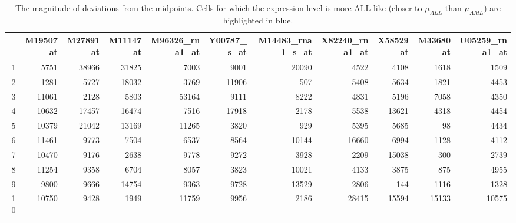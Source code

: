 \begin{table}[ht]
	\tiny
	\centering
	\begin{tabular}{r|rrrrr|rrrrr}
		\hline
		& M19507\_at & M27891\_at & M11147\_at & M96326\_rna1\_at & Y00787\_s\_at & M14483\_rna1\_s\_at & X82240\_rna1\_at & X58529\_at & M33680\_at & U05259\_rna1\_at \\ 
		\hline
		1 & 5751 \cellcolor{lightblue} & 38966 & 31825 & 7003 \cellcolor{lightblue} & 9001 \cellcolor{lightblue} & 20090 & 4522 & 4108 \cellcolor{lightblue} & 1618 & 1509 \\ 
		2 & 1281 & 5727 \cellcolor{lightblue} & 18032 & 3769 \cellcolor{lightblue} &  11906 & 507 & 5408 & 5634 & 1821 & 4453 \\ 
		3 & 11061 & 2128 \cellcolor{lightblue} & 5803 & 53164 & 9111 \cellcolor{lightblue} & 8222 & 4831 & 5196 & 7058 & 4350 \\ 
		4 & 10632 \cellcolor{lightblue} & 17457 & 16474 & 7516 \cellcolor{lightblue} & 17918 & 2178 \cellcolor{lightblue} & 5538 & 13621 \cellcolor{lightblue} & 4318 \cellcolor{lightblue} & 4454 \\ 
		5 & 10379 \cellcolor{lightblue}& 21042 & 13169 & 11265 & 3820 & 929 & 5395 & 5685 & 98 & 4434 \\ 
		6 & 11461 \cellcolor{lightblue}& 9773 \cellcolor{lightblue}& 7504 \cellcolor{lightblue} & 6537 \cellcolor{lightblue} & 8564 \cellcolor{lightblue} & 10144 \cellcolor{lightblue} & 16660 \cellcolor{lightblue} & 6994 \cellcolor{lightblue} & 1128 \cellcolor{lightblue} & 4112 \cellcolor{lightblue} \\ 
		7 & 10470 \cellcolor{lightblue}& 9176 \cellcolor{lightblue} & 2638 \cellcolor{lightblue} & 9778 \cellcolor{lightblue} & 9272 \cellcolor{lightblue} & 3928 & 2209 \cellcolor{lightblue} & 15038 \cellcolor{lightblue} & 300 & 2739 \cellcolor{lightblue} \\ 
		8 & 11254 \cellcolor{lightblue}& 9358 \cellcolor{lightblue} & 6704 \cellcolor{lightblue} & 8057 \cellcolor{lightblue} & 3823 \cellcolor{lightblue} & 10021 & 4133 & 3875 \cellcolor{lightblue} & 875 & 4955 \cellcolor{lightblue} \\ 
		9 & 9800 \cellcolor{lightblue}& 9666 \cellcolor{lightblue} & 14754 \cellcolor{lightblue} & 9363 \cellcolor{lightblue} & 9728 \cellcolor{lightblue} & 13529  & 2806 \cellcolor{lightblue} & 144 \cellcolor{lightblue} & 1116 \cellcolor{lightblue} & 1328 \cellcolor{lightblue} \\ 
		10 & 10750 \cellcolor{lightblue}& 9428 \cellcolor{lightblue} & 1949 & 11759 \cellcolor{lightblue} & 9956 \cellcolor{lightblue} & 2186 \cellcolor{lightblue} & 28415 \cellcolor{lightblue} & 15594 \cellcolor{lightblue} & 15133 \cellcolor{lightblue} & 10575 \cellcolor{lightblue} \\ 
		\hline
	\end{tabular}
	\caption{The magnitude of deviations from the midpoints. Cells for which the expression level is more ALL-like (closer to $\mu_{ALL}$ than $\mu_{AML}$) are highlighted in blue.}
	\label{golubTestDataMagnitudes}
\end{table}

